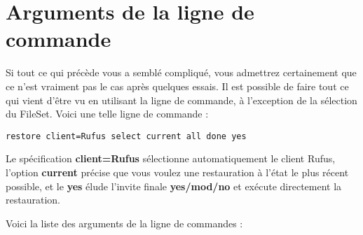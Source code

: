 \label{CommandArguments}

\section{Arguments de la ligne de commande}

Si tout ce qui pr\'ec\`ede vous a sembl\'e compliqu\'e, vous admettrez certainement 
que ce n'est vraiment pas le cas apr\`es quelques essais. Il est possible de 
faire tout ce qui vient d'\^etre vu en utilisant la ligne de commande, \`a 
l'exception de la s\'election du FileSet. Voici une telle ligne de commande :

\footnotesize
\begin{verbatim}
restore client=Rufus select current all done yes
\end{verbatim}
\normalsize

Le sp\'ecification {\bf client=Rufus} s\'electionne automatiquement le client Rufus, 
l'option {\bf current} pr\'ecise que vous voulez une restauration \`a l'\'etat le plus 
r\'ecent possible, et le  {\bf yes} \'elude l'invite finale {\bf yes/mod/no} et 
ex\'ecute directement la restauration.

Voici la liste des arguments de la ligne de commandes :

